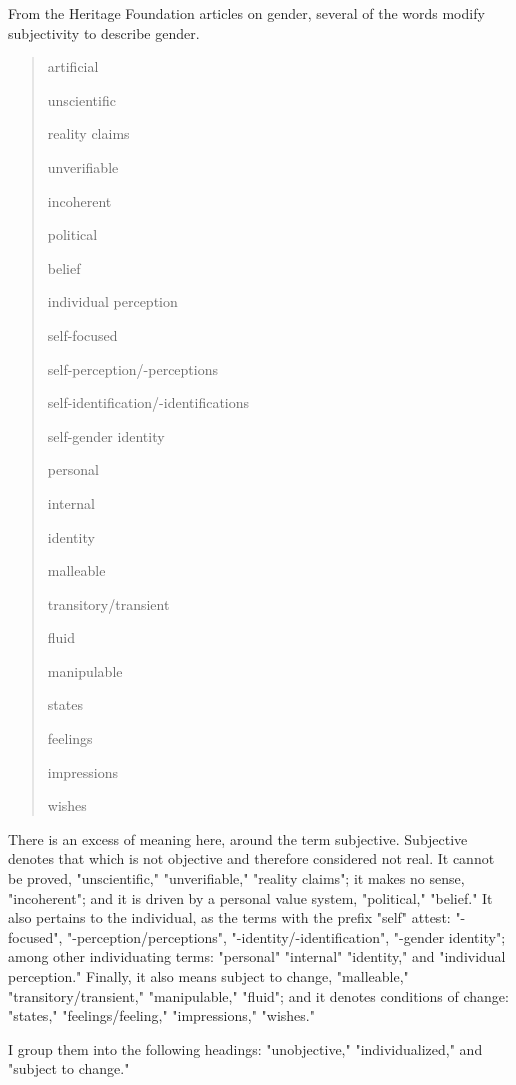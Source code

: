 \documentclass[11pt]{article}
\begin{document}
\begin{enumerate}
From the Heritage Foundation articles on gender, several of the words
modify subjectivity to describe gender.

\begin{quote}
artificial

unscientific

reality claims

unverifiable

incoherent

political

belief

individual perception

self-focused

self-perception/-perceptions

self-identification/-identifications

self-gender identity

personal

internal

identity

malleable

transitory/transient

fluid

manipulable

states

feelings

impressions

wishes
\end{quote}

There is an excess of meaning here, around the term subjective.
Subjective denotes that which is not objective and therefore
considered not real. It cannot be proved, "unscientific,"
"unverifiable," "reality claims"; it makes no sense, "incoherent"; and
it is driven by a personal value system, "political," "belief." It
also pertains to the individual, as the terms with the prefix "self"
attest: "-focused", "-perception/perceptions",
"-identity/-identification", "-gender identity"; among other
individuating terms: "personal" "internal" "identity," and "individual
perception." Finally, it also means subject to change, "malleable,"
"transitory/transient," "manipulable," "fluid"; and it denotes
conditions of change: "states," "feelings/feeling," "impressions,"
"wishes."

I group them into the following headings: "unobjective,"
"individualized," and "subject to change."


\end{enumerate}
\end{document}
